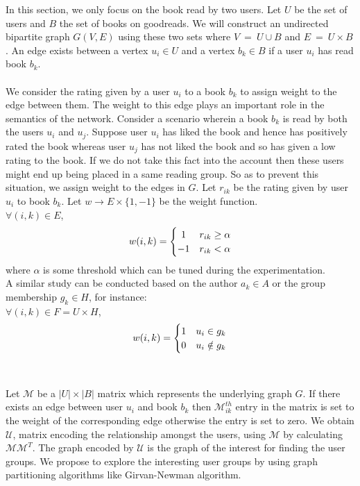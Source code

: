 \documentclass[11pt]{article}
\begin{document}
In this section, we only focus on the book read by two users. Let $U$ be the set of users and $B$ the set of books on goodreads. We will construct an undirected bipartite graph $G(V, E)$ using these two sets where $V ~=~ U \cup B$ and $E~=~U \times B$. An edge exists between a vertex $u_i \in U$ and a vertex $b_k \in B$ if a user $u_i$ has read book $b_k$.\\\\
We consider the rating given by a user $u_i$ to a book $b_k$ to assign weight to the edge between them. The weight to this edge plays an important role in the semantics of the network. Consider a scenario wherein a book $b_k$ is read by both the users $u_i$ and $u_j$. Suppose user $u_i$ has liked the book and hence has positively rated the book whereas user $u_j$ has not liked the book and so has given a low rating to the book. If we do not take this fact into the account then these users might end up being placed in a same reading group. So as to prevent this situation, we assign weight to the edges in $G$. Let $r_{ik}$ be the rating given by user $u_i$ to book $b_k$. Let $w \rightarrow E \times \{1, -1\}$ be the weight function.\\
$\forall (i, k) \in E$, 
\[
	w(i, k) = \left\{\def\arraystretch{1.2}%
		\begin{array}{@{}c@{\quad}l@{}}
		1 & r_{ik} \geq \alpha\\
		-1 & r_{ik} < \alpha\\
		\end{array}\right.
\]
where $\alpha$ is some threshold which can be tuned during the experimentation.\\
A similar study can be conducted based on the author $a_k \in A$ or the group membership $g_k \in H$, for instance:\\
$\forall (i, k) \in F=U \times H$, 
\[
	w(i, k) = \left\{\def\arraystretch{1.2}%
		\begin{array}{@{}c@{\quad}l@{}}
		1 & u_i \in g_k\\
		0 & u_i \notin g_k\\
		\end{array}\right.
\]
\\\\

Let $\mathcal{M}$ be a $|U| \times |B|$ matrix which represents the underlying graph $G$. If there exists an edge between user $u_i$ and book $b_k$ then $\mathcal{M}_{ik}^{th}$ entry in the matrix is set to the weight of the corresponding edge otherwise the entry is set to zero. We obtain $\mathcal{U}$, matrix encoding the relationship amongst the users, using $\mathcal{M}$ by calculating $\mathcal{M}\mathcal{M}^{T}$. The graph encoded by $\mathcal{U}$ is the graph of the interest for finding the user groups. We propose to explore the interesting user groups by using graph partitioning algorithms like Girvan-Newman algorithm.
\end{document}
